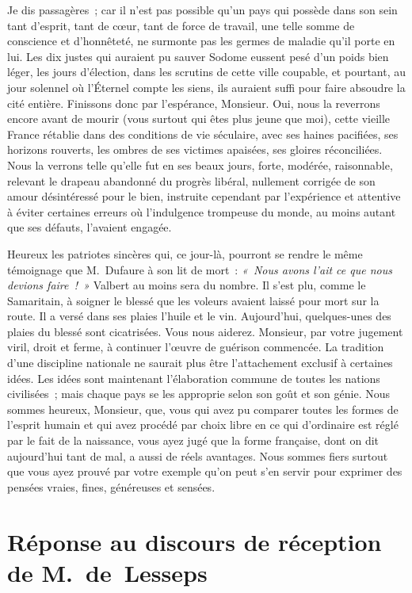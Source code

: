 \documentclass[french,twoside]{book} %
\newcommand\orgName[1]{#1}
\newcommand\persName[1]{#1}
\begin{document}
Je dis passagères ; car il n’est pas possible qu’un pays qui possède dans son sein tant d’esprit, tant de cœur, tant de force de travail, une telle somme de conscience et d’honnêteté, ne surmonte pas les germes de maladie qu’il porte en lui. Les dix justes qui auraient pu sauver Sodome eussent pesé d’un poids bien léger, les jours d’élection, dans les scrutins de cette ville coupable, et pourtant, au jour solennel où l’Éternel compte les siens, ils auraient suffi pour faire absoudre la cité entière. Finissons donc par l’espérance, Monsieur. Oui, nous la reverrons encore avant de mourir (vous surtout qui êtes plus jeune que moi), cette vieille {\orgName France} rétablie dans des conditions de vie séculaire, avec ses haines pacifiées, ses horizons rouverts, les ombres de ses victimes apaisées, ses gloires réconciliées. Nous la verrons telle qu’elle fut en ses beaux jours, forte, modérée, raisonnable, relevant le drapeau abandonné du progrès libéral, nullement corrigée de son amour désintéressé pour le bien, instruite cependant par l’expérience et attentive à éviter certaines erreurs où l’indulgence trompeuse du monde, au moins autant que ses défauts, l’avaient engagée.\par
Heureux les patriotes sincères qui, ce jour-là, pourront se rendre le même témoignage que {\persName M. Dufaure} à son lit de mort : \emph{« Nous avons l’ait ce que nous devions faire ! »} {\persName Valbert} au moins sera du nombre. Il s’est plu, comme le {\persName Samaritain}, à soigner le blessé que les voleurs avaient laissé pour mort sur la route. Il a versé dans ses plaies l’huile et le vin. Aujourd’hui, quelques-unes des plaies du blessé sont cicatrisées. Vous nous aiderez. Monsieur, par votre jugement viril, droit et ferme, à continuer l’œuvre de guérison commencée. La tradition d’une discipline nationale ne saurait plus être l’attachement exclusif à certaines idées. Les idées sont maintenant l’élaboration commune de toutes les nations civilisées ; mais chaque pays se les approprie selon son goût et son génie. Nous sommes heureux, Monsieur, que, vous qui avez pu comparer toutes les formes de l’esprit humain et qui avez procédé par choix libre en ce qui d’ordinaire est réglé par le fait de la naissance, vous ayez jugé que la forme française, dont on dit aujourd’hui tant de mal, a aussi de réels avantages. Nous sommes fiers surtout que vous ayez prouvé par votre exemple qu’on peut s’en servir pour exprimer des pensées vraies, fines, généreuses et sensées.
\section[{Réponse au discours de réception de M. de Lesseps}]{Réponse au discours de réception de {\persName M. de Lesseps}}\renewcommand{\leftmark}{Réponse au discours de réception de {\persName M. de Lesseps}}
\end{document}
